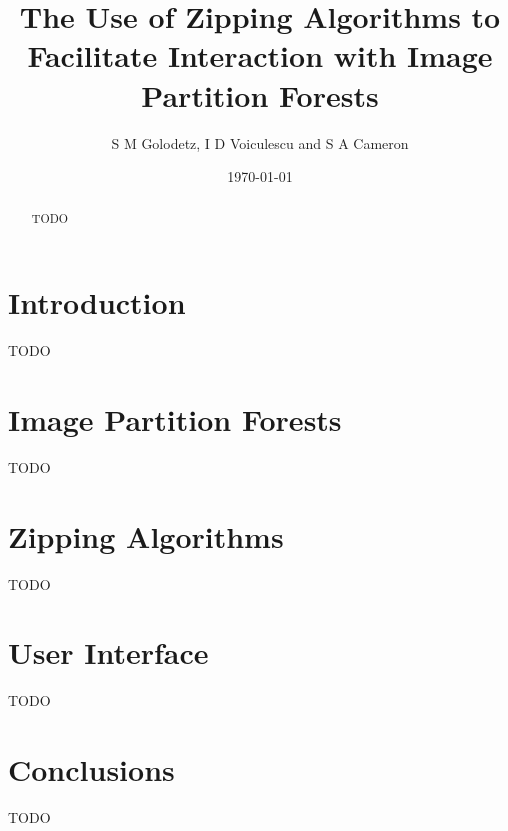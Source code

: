 \documentclass[a4paper]{article}
\begin{document}
\title{The Use of Zipping Algorithms to Facilitate Interaction with Image Partition Forests}
\author{S M Golodetz, I D Voiculescu and S A Cameron}
\date{\today}
\maketitle

\begin{abstract}
\noindent TODO
\end{abstract}

\section{Introduction}

TODO

\section{Image Partition Forests}

TODO

\section{Zipping Algorithms}

TODO

\section{User Interface}

TODO

\section{Conclusions}

TODO
\end{document}

